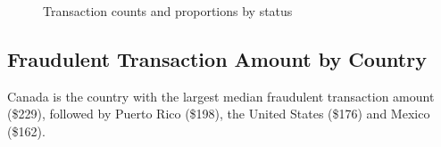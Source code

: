 \documentclass[12pt]{article}
\begin{document}
\begin{figure}[h!]
    \centering
    \vspace{\baselineskip}
    \label{fig:side-by-side}
    \caption{Transaction counts and proportions by status}
\end{figure}
   


\newpage
\subsection{Fraudulent Transaction Amount by Country}
Canada is the country with the largest median fraudulent transaction amount (\$229), followed by Puerto Rico (\$198), the United States (\$176) and Mexico (\$162).
\end{document}
